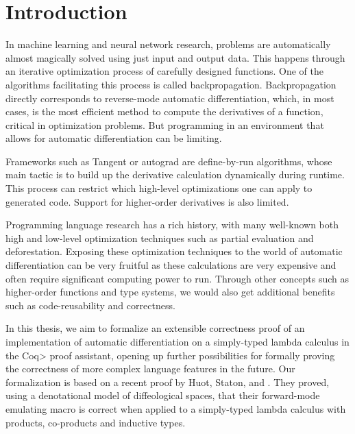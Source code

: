\section{Introduction}
In machine learning and neural network research, problems are automatically almost magically solved using just input and output data.
This happens through an iterative optimization process of carefully designed functions.
One of the algorithms facilitating this process is called backpropagation.
Backpropagation directly corresponds to reverse-mode automatic differentiation, which, in most cases, is the most efficient method to compute the derivatives of a function, critical in optimization problems.
But programming in an environment that allows for automatic differentiation can be limiting.

Frameworks such as Tangent or autograd are define-by-run algorithms, whose main tactic is to build up the derivative calculation dynamically during runtime.
This process can restrict which high-level optimizations one can apply to generated code.
Support for higher-order derivatives is also limited.

Programming language research has a rich history, with many well-known both high and low-level optimization techniques such as partial evaluation and deforestation.
Exposing these optimization techniques to the world of automatic differentiation can be very fruitful as these calculations are very expensive and often require significant computing power to run.
Through other concepts such as higher-order functions and type systems, we would also get additional benefits such as code-reusability and correctness.

In this thesis, we aim to formalize an extensible correctness proof of an implementation of automatic differentiation on a simply-typed lambda calculus in the \<Coq> proof assistant, opening up further possibilities for formally proving the correctness of more complex language features in the future.
Our formalization is based on a recent proof by Huot, Staton, and \Vakar{} \cite{huot2020correctness}.
They proved, using a denotational model of diffeological spaces, that their forward-mode emulating macro is correct when applied to a simply-typed lambda calculus with products, co-products and inductive types.


